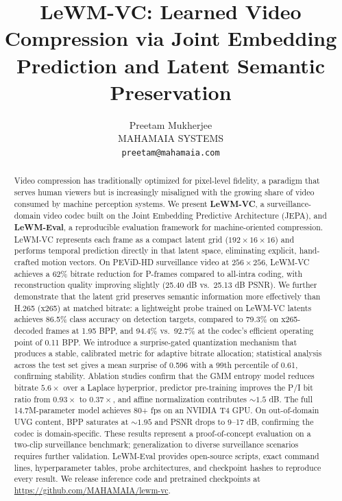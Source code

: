 \documentclass{article}
\title{LeWM-VC: Learned Video Compression via Joint Embedding Prediction and Latent Semantic Preservation}
\author{
  Preetam Mukherjee \\
  MAHAMAIA SYSTEMS \\
  \texttt{preetam@mahamaia.com} \\
}
\begin{document}
\maketitle
\fancyhead{}
\chead{}
\renewcommand{\headrulewidth}{0.4pt}

\begin{abstract}
Video compression has traditionally optimized for pixel-level fidelity, a paradigm that serves human viewers but is increasingly misaligned with the growing share of video consumed by machine perception systems. We present \textbf{LeWM-VC}, a surveillance-domain video codec built on the Joint Embedding Predictive Architecture (JEPA), and \textbf{LeWM-Eval}, a reproducible evaluation framework for machine-oriented compression. LeWM-VC represents each frame as a compact latent grid ($192{\times}16{\times}16$) and performs temporal prediction directly in that latent space, eliminating explicit, hand-crafted motion vectors. On PEViD-HD surveillance video at $256{\times}256$, LeWM-VC achieves a 62\% bitrate reduction for P-frames compared to all-intra coding, with reconstruction quality improving slightly (25.40 dB vs.\ 25.13 dB PSNR). We further demonstrate that the latent grid preserves semantic information more effectively than H.265 (x265) at matched bitrate: a lightweight probe trained on LeWM-VC latents achieves 86.5\% class accuracy on detection targets, compared to 79.3\% on x265-decoded frames at 1.95 BPP, and 94.4\% vs.\ 92.7\% at the codec's efficient operating point of 0.11 BPP. We introduce a surprise-gated quantization mechanism that produces a stable, calibrated metric for adaptive bitrate allocation; statistical analysis across the test set gives a mean surprise of 0.596 with a 99th percentile of 0.61, confirming stability. Ablation studies confirm that the GMM entropy model reduces bitrate $5.6{\times}$ over a Laplace hyperprior, predictor pre-training improves the P/I bit ratio from $0.93{\times}$ to $0.37{\times}$, and affine normalization contributes ${\sim}1.5$ dB. The full 14.7M-parameter model achieves 80+ fps on an NVIDIA T4 GPU. On out-of-domain UVG content, BPP saturates at ${\sim}1.95$ and PSNR drops to 9--17 dB, confirming the codec is domain-specific. These results represent a proof-of-concept evaluation on a two-clip surveillance benchmark; generalization to diverse surveillance scenarios requires further validation. LeWM-Eval provides open-source scripts, exact command lines, hyperparameter tables, probe architectures, and checkpoint hashes to reproduce every result. We release inference code and pretrained checkpoints at \url{https://github.com/MAHAMAIA/lewm-vc}.
\end{abstract}
\end{document}
